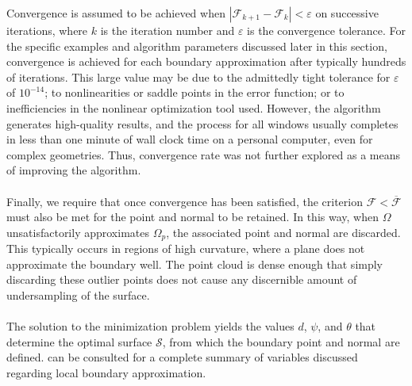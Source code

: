 Convergence is assumed to be achieved when $\left| \mathcal{F}_{k+1} - \mathcal{F}_{k}\right| < \varepsilon$ on successive iterations, where $k$ is the iteration number and  $\varepsilon$ is the convergence tolerance. For the specific examples and algorithm parameters discussed later in this section, convergence is achieved for each boundary approximation after typically hundreds of iterations. This large value may be due to the admittedly tight tolerance for $\varepsilon$ of $10^{-14}$; to nonlinearities or saddle points in the error function; or to inefficiencies in the nonlinear optimization tool used. However, the algorithm generates high-quality results, and the process for all windows usually completes in less than one minute of wall clock time on a personal computer, even for complex geometries. Thus, convergence rate was not further explored as a means of improving the algorithm. \\ \\
%
Finally, we require that once convergence has been satisfied, the criterion $\mathcal{F} < \overline{\mathcal{F}}$ must also be met for the point and normal to be retained. In this way, when $\Omega$ unsatisfactorily approximates $\Omega_p$, the associated point and normal are discarded. This typically occurs in regions of high curvature, where a plane does not approximate the boundary well. The point cloud is dense enough that simply discarding these outlier points does not cause any discernible amount of undersampling of the surface. \\ \\
%
The solution to the minimization problem yields the values $d$, $\psi$, and $\theta$ that determine the optimal surface $\mathcal{S}$, from which the boundary point and normal are defined.  can be consulted for a complete summary of variables discussed regarding local boundary approximation. \\

